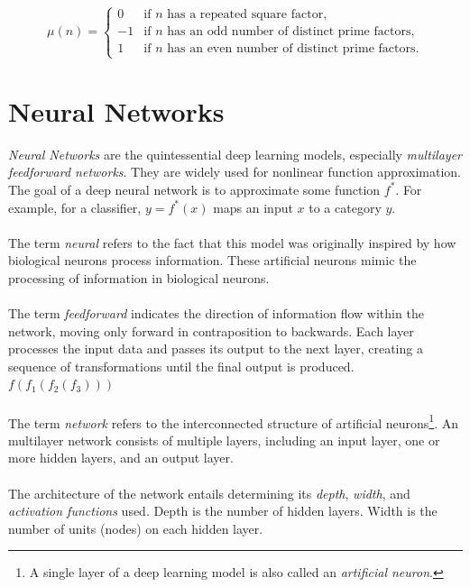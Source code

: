 \documentclass[../main.tex]{subfiles}
\begin{document}
\[
\mu(n) = \begin{cases}
	0 & \text{if } n \text{ has a repeated square factor}, \\
	-1 & \text{if } n \text{ has an odd number of distinct prime factors}, \\
	1 & \text{if } n \text{ has an even number of distinct prime factors}.
\end{cases}
\]

\section{Neural Networks}
	
	 
	 \noindent \textit{Neural Networks} are the quintessential deep learning models, especially \textit{multilayer feedforward networks}. They are widely used for nonlinear function approximation. The goal of a deep neural network is to approximate some function $f^*$. For example, for a classifier, $y = f^*(x)$ maps an input $x$ to a category $y$.  \\ \\ 
	 \noindent The term \textit{neural} refers  to the fact that this model was originally inspired by how biological neurons process information. These artificial neurons mimic the processing of information in biological neurons. \\ \\ 
	 \noindent The term \textit{feedforward} indicates the direction of information flow within the network, moving only forward in contraposition to backwards. Each layer processes the input data and passes its output to the next layer, creating a sequence of transformations until the final output is produced. $f(f_1(f_2(f_3)))$ \\ \\
	 \noindent The term \textit{network} refers to the interconnected structure of artificial neurons\footnote{A single layer of a deep learning model is also called an\textit{ artificial neuron}. }. An multilayer network consists of multiple layers, including an input layer, one or more hidden layers, and an output layer. \\ \\ %
	 \noindent The architecture of the network entails determining its \textit{depth}, \textit{width}, and \textit{activation functions} used. Depth is the number of hidden layers. Width is the number of units (nodes) on each hidden layer. 
	 
\end{document}
